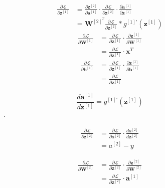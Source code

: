 \documentclass[12pt]{report}
\numberwithin{equation}{section}
\begin{document}
\begin{landscape}
\begin{figure}[t]
\begin{minipage}[b]{.2\linewidth}
\[\begin{split}
\frac{\partial \mathcal{L}}{\partial \mathbf{z}^{[1]}} &= \frac{\partial \mathbf{z}^{[2]}}{\partial \mathbf{a}^{[1]}} \cdot \frac{\partial \mathcal{L}}{\partial \mathbf{z}^{[2]}} \cdot \frac{\partial \mathbf{a}^{[1]}}{\partial \mathbf{z}^{[1]}} \\
	&= \mathbf{W}^{{[2]}^T} \frac{\partial \mathcal{L}}{\partial \mathbf{z}^{[2]}} * g^{[1]'}(\mathbf{z}^{[1]})
\end{split}\]
\[\begin{split}
\frac{\partial \mathcal{L}}{\partial \mathbf{W}^{[1]}} &= \frac{\partial \mathcal{L}}{\partial \mathbf{z}^{[1]}} \cdot \frac{\partial \mathbf{z}^{[1]}}{\partial \mathbf{W}^{[1]}} \\
	&=  \frac{\partial \mathcal{L}}{\partial \mathbf{z}^{[1]}} \cdot \mathbf{x}^T
\end{split}\]
\[\begin{split}
\frac{\partial \mathcal{L}}{\partial \mathbf{b}^{[1]}} &= \frac{\partial \mathcal{L}}{\partial \mathbf{z}^{[1]}} \cdot \frac{\partial \mathbf{z}^{[1]}}{\partial \mathbf{b}^{[1]}} \\
	&=  \frac{\partial \mathcal{L}}{\partial \mathbf{z}^{[1]}} 
\end{split}\]
\end{minipage}
\hfill
\begin{minipage}[b]{.2\linewidth}
\[ 
\frac{d \mathbf{a}^{[1]}}{d \mathbf{z}^{[1]}} = g^{[1]'}(\mathbf{z}^{[1]})
\]
\vskip 4.5cm
{.}
\end{minipage}
\hfill
\begin{minipage}[b]{.2\linewidth}
\[\begin{split}
\frac{\partial \mathcal{L}}{\partial \mathbf{z}^{[2]}} &= \frac{\partial \mathcal{L}}{\partial a^{[2]}} \cdot \frac{d a^{[2]}}{d \mathbf{z}^{[2]}}  \\
	&= a^{[2]} - y
\end{split}\]

\[\begin{split}
\frac{\partial \mathcal{L}}{\partial \mathbf{W}^{[2]}} &= \frac{\partial \mathcal{L}}{\partial \mathbf{z}^{[2]}} \cdot \frac{\partial \mathbf{z}^{[2]}}{\partial \mathbf{W}^{[2]}} \\
	&=  \frac{\partial \mathcal{L}}{\partial \mathbf{z}^{[2]}} \cdot \mathbf{a}^{[1]}
\end{split}\]


\end{minipage}
\end{figure}
\end{landscape}
\end{document}
